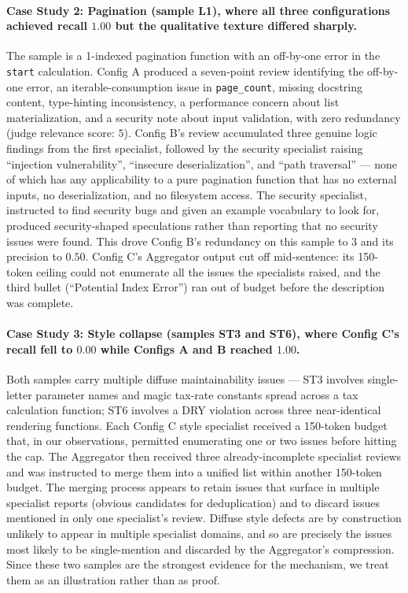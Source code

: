 \documentclass[pdflatex,sn-mathphys-num]{sn-jnl}
\theoremstyle{thmstyleone}
\theoremstyle{thmstyletwo}
\theoremstyle{thmstylethree}
\begin{document}
\paragraph{Case Study 2: Pagination (sample L1), where all three configurations achieved recall $1.00$ but the qualitative texture differed sharply.} The sample is a 1-indexed pagination function with an off-by-one error in the \texttt{start} calculation. Config A produced a seven-point review identifying the off-by-one error, an iterable-consumption issue in \texttt{page\_count}, missing docstring content, type-hinting inconsistency, a performance concern about list materialization, and a security note about input validation, with zero redundancy (judge relevance score: $5$). Config B's review accumulated three genuine logic findings from the first specialist, followed by the security specialist raising ``injection vulnerability'', ``insecure deserialization'', and ``path traversal'' --- none of which has any applicability to a pure pagination function that has no external inputs, no deserialization, and no filesystem access. The security specialist, instructed to find security bugs and given an example vocabulary to look for, produced security-shaped speculations rather than reporting that no security issues were found. This drove Config B's redundancy on this sample to $3$ and its precision to $0.50$. Config C's Aggregator output cut off mid-sentence: its 150-token ceiling could not enumerate all the issues the specialists raised, and the third bullet (``Potential Index Error'') ran out of budget before the description was complete.

\paragraph{Case Study 3: Style collapse (samples ST3 and ST6), where Config C's recall fell to $0.00$ while Configs A and B reached $1.00$.} Both samples carry multiple diffuse maintainability issues --- ST3 involves single-letter parameter names and magic tax-rate constants spread across a tax calculation function; ST6 involves a DRY violation across three near-identical rendering functions. Each Config C style specialist received a 150-token budget that, in our observations, permitted enumerating one or two issues before hitting the cap. The Aggregator then received three already-incomplete specialist reviews and was instructed to merge them into a unified list within another 150-token budget. The merging process appears to retain issues that surface in multiple specialist reports (obvious candidates for deduplication) and to discard issues mentioned in only one specialist's review. Diffuse style defects are by construction unlikely to appear in multiple specialist domains, and so are precisely the issues most likely to be single-mention and discarded by the Aggregator's compression. Since these two samples are the strongest evidence for the mechanism, we treat them as an illustration rather than as proof.
\end{document}

